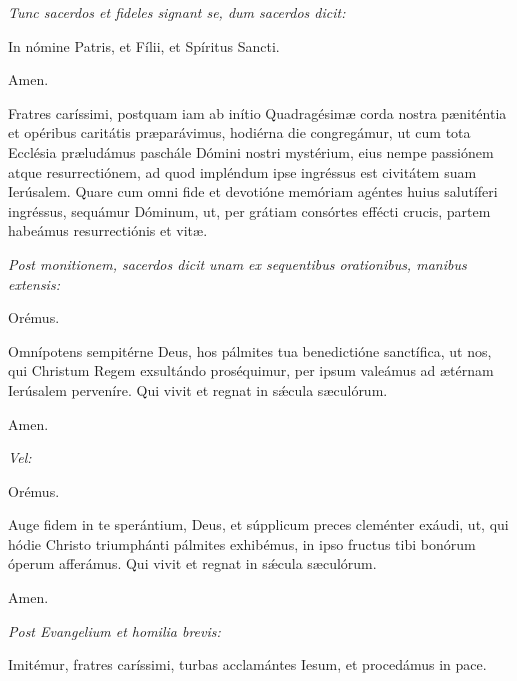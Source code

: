 \textit{Tunc sacerdos et fideles signant se, dum sacerdos dicit:}

\Vbardot{} In nómine Patris, \grecross{} et Fílii, et Spíritus Sancti.

\Rbardot{} Amen.

Fratres caríssimi, postquam iam ab inítio Quadragésimæ corda nostra pæniténtia et opéribus caritátis præparávimus, hodiérna die congregámur, ut cum tota Ecclésia præludámus paschále Dómini nostri mystérium, eius nempe passiónem atque resurrectiónem, ad quod impléndum ipse ingréssus est civitátem suam Ierúsalem. Quare cum omni fide et devotióne memóriam agéntes huius salutíferi ingréssus, sequámur Dóminum, ut, per grátiam consórtes effécti crucis, partem habeámus resurrectiónis et vitæ.

\textit{Post monitionem, sacerdos dicit unam ex sequentibus orationibus, manibus extensis:}

Orémus.

Omnípotens sempitérne Deus, hos pálmites tua benedictióne \grecross{} sanctífica, ut nos, qui Christum Regem exsultándo proséquimur, per ipsum valeámus ad ætérnam Ierúsalem perveníre. Qui vivit et regnat in sǽcula sæculórum.

\Rbardot{} Amen.

\textit{Vel:}

Orémus.

Auge fidem in te sperántium, Deus, et súpplicum preces cleménter exáudi, ut, qui hódie Christo triumphánti pálmites exhibémus, in ipso fructus tibi bonórum óperum afferámus. Qui vivit et regnat in sǽcula sæculórum.

\Rbardot{} Amen.

\textit{Post Evangelium et homilia brevis:}

Imitémur, fratres caríssimi, turbas acclamántes Iesum, et procedámus in pace.
